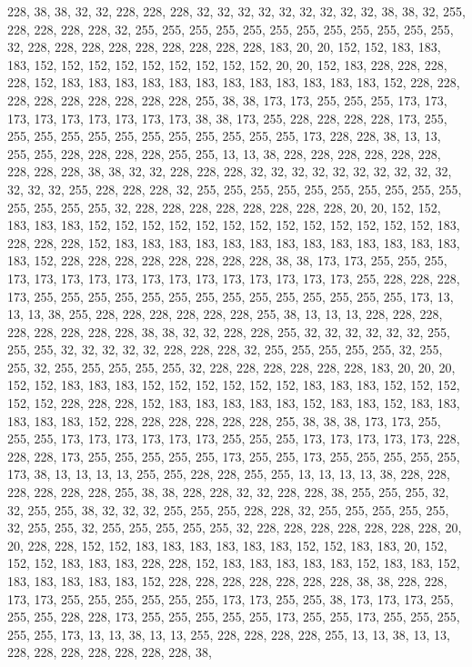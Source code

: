 {	228, 38,  38,  32,  32,  228, 228, 228, 32,  32,  32,  32,  32,  32,  32,  32,  32,  38,  38,  32,  255, 228, 228, 228, 228, 32,  255, 255, 255, 255, 255, 255, 255, 255, 255, 255, 255, 255, 32,  228, 228, 228, 228, 228, 228, 228, 228, 228, 183, 20,  20,  152, 152, 183, 183, 183, 152, 152, 152, 152, 152, 152, 152, 152, 152, 20,  20,  152, 183, 228, 228, 228, 228, 152, 183, 183, 183, 183, 183, 183, 183, 183, 183, 183, 183, 183, 152, 228, 228, 228, 228, 228, 228, 228, 228, 228, 255, 38,  38,  173, 173, 255, 255, 255, 173, 173, 173, 173, 173, 173, 173, 173, 173, 38,  38,  173, 255, 228, 228, 228, 228, 173, 255, 255, 255, 255, 255, 255, 255, 255, 255, 255, 255, 255, 173, 228, 228, 38,  13,  13,  255, 255, 228, 228, 228, 228, 255, 255, 13,  13,  38,  228, 228, 228, 228, 228, 228, 228, 228, 228, 
	38,  38,  32,  32,  228, 228, 228, 32,  32,  32,  32,  32,  32,  32,  32,  32,  32,  32,  32,  32,  255, 228, 228, 228, 32,  255, 255, 255, 255, 255, 255, 255, 255, 255, 255, 255, 255, 255, 255, 32,  228, 228, 228, 228, 228, 228, 228, 228, 20,  20,  152, 152, 183, 183, 183, 152, 152, 152, 152, 152, 152, 152, 152, 152, 152, 152, 152, 152, 183, 228, 228, 228, 152, 183, 183, 183, 183, 183, 183, 183, 183, 183, 183, 183, 183, 183, 183, 152, 228, 228, 228, 228, 228, 228, 228, 228, 38,  38,  173, 173, 255, 255, 255, 173, 173, 173, 173, 173, 173, 173, 173, 173, 173, 173, 173, 173, 255, 228, 228, 228, 173, 255, 255, 255, 255, 255, 255, 255, 255, 255, 255, 255, 255, 255, 255, 173, 13,  13,  13,  38,  255, 228, 228, 228, 228, 228, 228, 255, 38,  13,  13,  13,  228, 228, 228, 228, 228, 228, 228, 228, 
	38,  38,  32,  32,  228, 228, 255, 32,  32,  32,  32,  32,  32,  255, 255, 255, 32,  32,  32,  32,  32,  228, 228, 228, 32,  255, 255, 255, 255, 255, 32,  255, 255, 32,  255, 255, 255, 255, 255, 32,  228, 228, 228, 228, 228, 228, 183, 20,  20,  20,  152, 152, 183, 183, 183, 152, 152, 152, 152, 152, 152, 183, 183, 183, 152, 152, 152, 152, 152, 228, 228, 228, 152, 183, 183, 183, 183, 183, 152, 183, 183, 152, 183, 183, 183, 183, 183, 152, 228, 228, 228, 228, 228, 228, 255, 38,  38,  38,  173, 173, 255, 255, 255, 173, 173, 173, 173, 173, 173, 255, 255, 255, 173, 173, 173, 173, 173, 228, 228, 228, 173, 255, 255, 255, 255, 255, 173, 255, 255, 173, 255, 255, 255, 255, 255, 173, 38,  13,  13,  13,  13,  255, 255, 228, 228, 255, 255, 13,  13,  13,  13,  38,  228, 228, 228, 228, 228, 228, 255, 38,  
	38,  228, 228, 32,  32,  228, 228, 38,  255, 255, 255, 32,  32,  255, 255, 38,  32,  32,  32,  255, 255, 255, 228, 228, 32,  255, 255, 255, 255, 255, 32,  255, 255, 32,  255, 255, 255, 255, 255, 32,  228, 228, 228, 228, 228, 228, 228, 20,  20,  228, 228, 152, 152, 183, 183, 183, 183, 183, 183, 152, 152, 183, 183, 20,  152, 152, 152, 183, 183, 183, 228, 228, 152, 183, 183, 183, 183, 183, 152, 183, 183, 152, 183, 183, 183, 183, 183, 152, 228, 228, 228, 228, 228, 228, 228, 38,  38,  228, 228, 173, 173, 255, 255, 255, 255, 255, 255, 173, 173, 255, 255, 38,  173, 173, 173, 255, 255, 255, 228, 228, 173, 255, 255, 255, 255, 255, 173, 255, 255, 173, 255, 255, 255, 255, 255, 173, 13,  13,  38,  13,  13,  255, 228, 228, 228, 228, 255, 13,  13,  38,  13,  13,  228, 228, 228, 228, 228, 228, 228, 38,  
}
